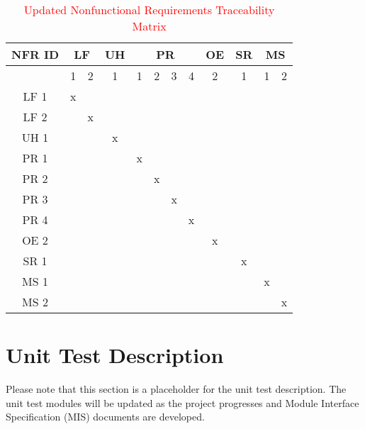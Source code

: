 \documentclass[12pt, titlepage]{article}
\begin{document}
\begin{enumerate}
\begin{enumerate}
\begin{enumerate}
\begin{enumerate}
\begin{landscape}
\begin{table}[H]
  \centering
  \begin{tabular}{|c|cc|c|cccc|c|c|cc|}
    \hline
    \multicolumn{1}{|c|}{\textbf{NFR ID}} & \multicolumn{2}{c|}{\textbf{LF}} & \textbf{UH} & \multicolumn{4}{c|}{\textbf{PR}} & \textbf{OE} & \textbf{SR} & \multicolumn{2}{c|}{\textbf{MS}} \\ 
    \hline
    & 1 & 2 & 1 & 1 & 2 & 3 & 4 & 2 & 1 & 1 & 2 \\ 
    \hline
    LF 1 & x &  &  &  &  &  &  &  &  &  &  \\ 
    \hline
    LF 2 &  & x &  &  &  &  &  &  &  &  &  \\ 
    \hline
    UH 1 &  &  & x &  &  &  &  &  &  &  &  \\ 
    \hline
    PR 1 &  &  &  & x &  &  &  &  &  &  &  \\ 
    \hline
    PR 2 &  &  &  &  & x &  &  &  &  &  &  \\ 
    \hline
    PR 3 &  &  &  &  &  & x &  &  &  &  &  \\ 
    \hline
    PR 4 &  &  &  &  &  &  & x &  &  &  &  \\ 
    \hline
    OE 2 &  &  &  &  &  &  &  & x &  &  &  \\ 
    \hline
    SR 1 &  &  &  &  &  &  &  &  & x &  &  \\ 
    \hline
    MS 1 &  &  &  &  &  &  &  &  &  & x &  \\ 
    \hline
    MS 2 &  &  &  &  &  &  &  &  &  &  & x \\ 
    \hline
  \end{tabular}
  \caption{\textcolor{red}{Updated Nonfunctional Requirements Traceability Matrix}}
  \label{tab:nf_requirements}
\end{table}





  \end{landscape}
  
\section{Unit Test Description}
Please note that this section is a placeholder for the unit test description. The unit test modules will be updated as the project progresses and Module Interface Specification (MIS) documents are developed.

\end{enumerate}
\end{enumerate}
\end{enumerate}
\end{enumerate}
\end{document}
